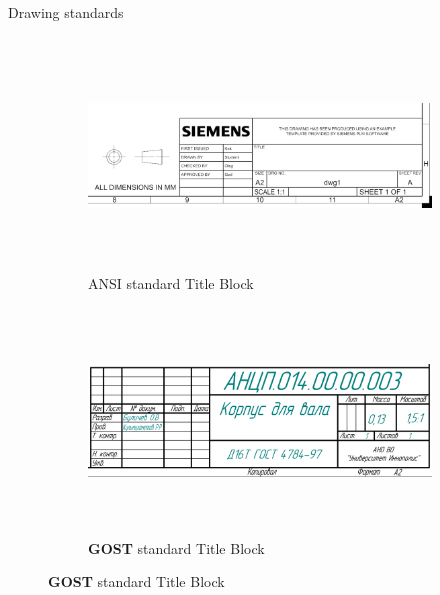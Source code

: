 \documentclass[aspectratio=169]{beamer}
\begin{document}
\begin{frame}[c]{Drawing standards}
    \framesubtitle{}
    \vspace{-0.6cm}
    \begin{figure}[H]
        \begin{subfigure}{0.49\textwidth}
            \centering\includegraphics[height=6cm,width=1\textwidth,keepaspectratio]{resources/ansi.png}
            \caption*{ANSI standard Title Block}
            \label{fig:resources/ansi.png}
        \end{subfigure}
        \begin{subfigure}{0.49\textwidth}
            \centering\includegraphics[height=6cm,width=1\textwidth,keepaspectratio]{resources/gost.png}
            \caption*{\textbf{GOST} standard Title Block}
            \label{fig:resources/gost.png}
        \end{subfigure}
    \end{figure}
\end{frame}
\end{document}
